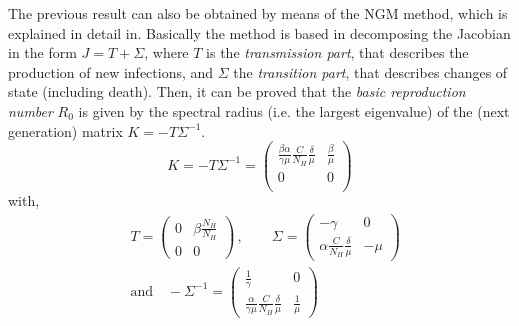 The previous result can also be obtained by means of the NGM method,
which is explained in detail in\cite{Diekmann2010}. Basically the method is
based in decomposing the Jacobian in the form
$J=T+\Sigma$, where $T$ is the
\textit{transmission part}, that describes the production of new infections,
and $\Sigma$ the \textit{transition part}, that describes changes of
state (including death). Then, it can be proved \cite{Diekmann2010} that the
\textit{basic reproduction number} $R_0$ is given by the spectral radius (i.e.
the largest eigenvalue) of the (next generation) matrix $K=-T \Sigma^{-1}$.
\begin{equation}
    K=- T \Sigma^{-1} =
    \begin{pmatrix}
        \frac{\beta \alpha}{\gamma
        \mu}\frac{C}{N_H}\frac{\delta}{\mu} & \frac{\beta}{\mu} \\
        0                                   & 0                 \\
    \end{pmatrix}
    \label{eq:NGM_general}
\end{equation}
with,
\begin{equation*}
    \begin{aligned}
         & T =
        \begin{pmatrix}
            0 & \beta\frac{N_H}{N_H} \\
            0 & 0
        \end{pmatrix} \, , \qquad
        \Sigma =
        \begin{pmatrix}
            -\gamma                                & 0    \\
            \alpha \frac{C}{N_H}\frac{\delta}{\mu} & -\mu
        \end{pmatrix} \\
         & \textrm{and} \quad
        -{\Sigma}^{-1} =
        \begin{pmatrix}
            \frac{1}{\gamma}                                        & 0
            \\

            \frac{\alpha}{\gamma\mu}\frac{C}{N_H}\frac{\delta}{\mu} &
            \frac{1}{\mu}
        \end{pmatrix}
    \end{aligned}
    \label{eq:F-V_general}
\end{equation*}

